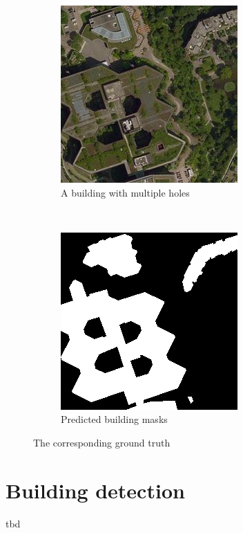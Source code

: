 \begin{figure}[H]
	\centering
	\begin{subfigure}{0.4\textwidth}
		\centering
    	\includegraphics[width=0.9\linewidth]{chapters/theoretical_and_experimental_results/images/building_with_hole.png}		    \caption{A building with multiple holes}
	\end{subfigure}~
		\begin{subfigure}{0.4\textwidth}
		\centering
    	\includegraphics[width=0.9\linewidth]{chapters/theoretical_and_experimental_results/images/building_with_hole_gt.png}		    \caption{Predicted building masks}
	\end{subfigure}
	\caption{The corresponding ground truth}
	\label{fig:results:buildings_with_holes_gt}
\end{figure}

\section{Building detection}
tbd